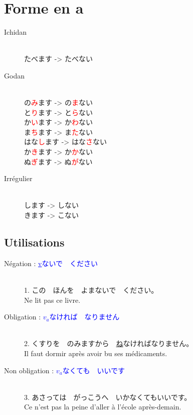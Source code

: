 \documentclass[11pt]{report}
\newenvironment{Japanese}{%
\CJKfamily{min}%
\CJKtilde  
\CJKnospace}{}
\begin{document}
\section{Forme en a}

\begin{CJK}{UTF8}{}  
\begin{Japanese}
	\begin{description}
		\item[Ichidan] \hfill \\
			たべます -> たべない
		\item[Godan] \hfill \\
			の\textcolor{red}{み}ます -> の\textcolor{red}{ま}ない \\
			と\textcolor{red}{り}ます -> と\textcolor{red}{ら}ない \\
			か\textcolor{red}{い}ます -> か\textcolor{red}{わ}ない \\
			ま\textcolor{red}{ち}ます -> ま\textcolor{red}{た}ない \\
			はな\textcolor{red}{し}ます -> はな\textcolor{red}{さ}ない \\
			か\textcolor{red}{き}ます -> か\textcolor{red}{か}ない \\
			ぬ\textcolor{red}{ぎ}ます -> ぬ\textcolor{red}{が}ない
		\item[Irrégulier] \hfill \\
			します -> しない \\
			きます -> こない
	\end{description}
\end{Japanese}  
\end{CJK}

\subsection{Utilisations}

\begin{CJK}{UTF8}{}  
\begin{Japanese}
	\begin{description}
		\item[Négation : \textcolor{blue}{\underline{v}ないで　ください}] \hfill \\
		1. この　ほんを　よまないで　ください。 \\
		Ne lit pas ce livre.
		\item[Obligation : \textcolor{blue}{\underline{$v_{a}$}なければ　なりません}] \hfill \\
		2. くすりを　のみますから　\underline{ね}なければなりません。 \\
		Il faut dormir après avoir bu ses médicaments.
		\item[Non obligation : \textcolor{blue}{\underline{$v_{a}$}なくても　いいです}] \hfill \\
		3. あさっては　がっこうへ　いかなくてもいいです。 \\
		Ce n'est pas la peine d'aller \`a l'école après-demain.
	\end{description}
\end{Japanese}
\end{CJK}
\end{document}
